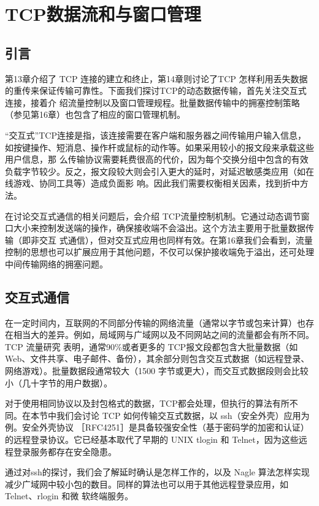 \chapter{TCP数据流和与窗口管理}
\minitoc

\section{引言}
第13章介绍了 TCP 连接的建立和终止，第14章则讨论了TCP 怎样利用丢失数据的重传来保证传输可靠性。下面我们探讨TCP的动态数据传输，首先关注交互式连接，接着介
绍流量控制以及窗口管理规程。批量数据传输中的拥塞控制策略（参见第16章）也包含了相应的窗口管理机制。

“交互式”TCP连接是指，该连接需要在客户端和服务器之间传输用户输入信息，如按键操作、短消息、操作杆或鼠标的动作等。如果采用较小的报文段来承载这些用户信息，那
么传输协议需要耗费很高的代价，因为每个交换分组中包含的有效负载字节较少。反之，报文段较大则会引入更大的延时，对延迟敏感类应用（如在线游戏、协同工具等）造成负面影
响。因此我们需要权衡相关因素，找到折中方法。

在讨论交互式通信的相关问题后，会介绍 TCP流量控制机制。它通过动态调节窗口大小来控制发送端的操作，确保接收端不会溢出。这个方法主要用于批量数据传输（即非交互
式通信），但对交互式应用也同样有效。在第16章我们会看到，流量控制的思想也可以扩展应用于其他问题，不仅可以保护接收端免于溢出，还可处理中间传输网络的拥塞问题。
\section{交互式通信}

在一定时间内，互联网的不同部分传输的网络流量（通常以字节或包来计算）也存在相当大的差异。例如，局域网与广域网以及不同网站之间的流量都会有所不同。TCP 流量研究
表明，通常90\%或者更多的 TCP报文段都包含大批量数据（如Web、文件共享、电子邮件、备份），其余部分则包含交互式数据（如远程登录、网络游戏）。批量数据段通常较大（1500
字节或更大），而交互式数据段则会比较小（几十字节的用户数据）。

对于使用相同协议以及封包格式的数据，TCP都会处理，但执行的算法有所不同。在本节中我们会讨论 TCP 如何传输交互式数据，以 ssh（安全外壳）应用为例。安全外壳协议
［RFC4251］是具备较强安全性（基于密码学的加密和认证）的远程登录协议。它已经基本取代了早期的 UNIX tlogin 和 Telnet，因为这些远程登录服务都存在安全隐患。

通过对ssh的探讨，我们会了解延时确认是怎样工作的，以及 Nagle 算法怎样实现减少广域网中较小包的数目。同样的算法也可以用于其他远程登录应用，如 Telnet、rlogin 和微
软终端服务。

